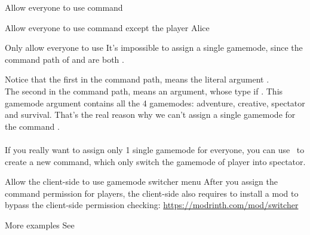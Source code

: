 \begin{example}{Allow everyone to use  command}
\end{example}

\begin{example}{Allow everyone to use  command except the player Alice}
    \\
\end{example}

\begin{example}{Only allow everyone to use }
    It's impossible to assign a single gamemode, since the command path of  and  are both .

    Notice that the first  in the command path, means the literal argument .\\
    The second  in the command path, means an argument, whose type if .
    This gamemode argument contains all the 4 gamemodes: adventure, creative, spectator and survival.
    That's the real reason why we can't assign a single gamemode for the command .\\\\
    If you really want to assign only 1 single gamemode for everyone, you can use~ to create a new command, which only switch the gamemode of player into spectator.

\end{example}

\begin{tips}{Allow the client-side to use gamemode switcher menu}
    After you assign the  command permission for players, the client-side also requires to install a mod to bypass the client-side permission checking: \url{https://modrinth.com/mod/switcher}
\end{tips}

\begin{example}{More examples}
    See~
\end{example}
